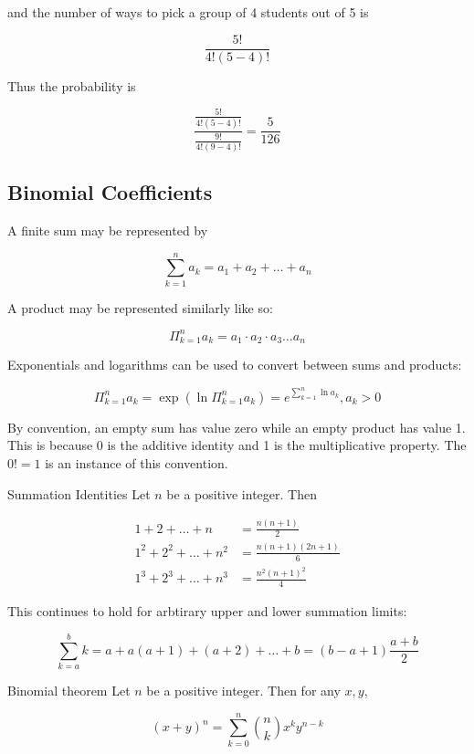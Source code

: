         and the number of ways to pick a group of 4 students out of 5 is

        \[
            \frac{5!}{4!(5-4)!}
        \]

        Thus the probability is

        \[
            \frac{\frac{5!}{4!(5-4)!}}{\frac{9!}{4!(9-4)!}} = \frac{5}{126}
        \]

    \subsection{Binomial Coefficients}

        A finite sum may be represented by

        \[
            \sum_{k=1}^n a_k = a_1 + a_2 + \dots + a_n
        \]

        A product may be represented similarly like so:

        \[
            \Pi_{k=1}^n a_k = a_1 \cdot a_2 \cdot a_3 \dots a_n
        \]

        Exponentials and logarithms can be used to convert between sums and products:

        \[
            \Pi_{k=1}^n a_k = \exp{\left(\ln{\Pi_{k=1}^n} a_k\right)} = e^{\sum^n_{k=1}\ln{a_k}}, a_k > 0
        \]

        By convention, an empty sum has value zero while an empty product has value 1. This is because 0 is the additive identity and 1 is the multiplicative property. The $0! = 1$ is an instance of this convention.

        \begin{axiom}{Summation Identities}
            Let $n$ be a positive integer. Then

            \begin{align*}
                1 + 2 + \dots + n   &= \frac{n(n+1)}{2} \\
                1^2 + 2^2 + \dots + n^2 &= \frac{n(n+1)(2n+1)}{6} \\
                1^3 + 2^3 + \dots + n^3 &= \frac{n^2 (n+1)^2}{4}
            \end{align*}
        \end{axiom}

        This continues to hold for arbtirary upper and lower summation limits:

        \[
            \sum^b_{k=a} k = a + a(a+1) + (a+2) + \dots + b = (b-a+1) \frac{a+b}{2}
        \]

        \begin{theorem}{Binomial theorem}
            Let $n$ be a positive integer. Then for any $x,y$,

            \[
                (x+y)^n = \sum^n_{k=0} \binom{n}{k} x^k y^{n-k}
            \]
        \end{theorem}

